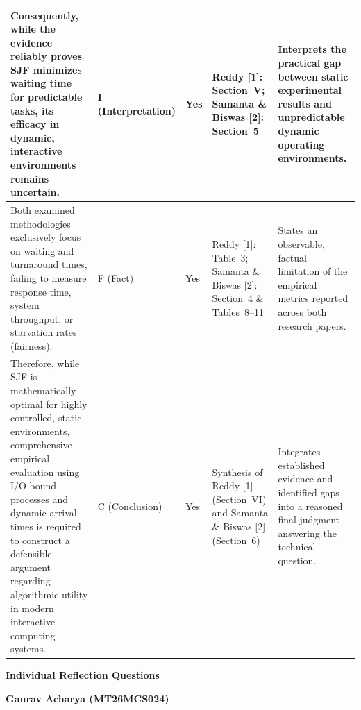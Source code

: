 \documentclass[11pt]{article}
\begin{document}
\begin{longtable}{ |p{3.8cm}|p{1.2cm}|p{1.8cm}|p{3.4cm}|p{4.0cm}| }
    Consequently, while the evidence reliably proves SJF minimizes waiting time for predictable tasks, its efficacy in dynamic, interactive environments remains uncertain. & I (Interpretation) & Yes & Reddy [1]: Section~V; Samanta \& Biswas [2]: Section~5 & Interprets the practical gap between static experimental results and unpredictable dynamic operating environments. \\
    \hline

    Both examined methodologies exclusively focus on waiting and turnaround times, failing to measure response time, system throughput, or starvation rates (fairness). & F (Fact) & Yes & Reddy [1]: Table~3; Samanta \& Biswas [2]: Section~4 \& Tables~8--11 & States an observable, factual limitation of the empirical metrics reported across both research papers. \\
    \hline

    Therefore, while SJF is mathematically optimal for highly controlled, static environments, comprehensive empirical evaluation using I/O-bound processes and dynamic arrival times is required to construct a defensible argument regarding algorithmic utility in modern interactive computing systems. & C (Conclusion) & Yes & Synthesis of Reddy [1] (Section~VI) and Samanta \& Biswas [2] (Section~6) & Integrates established evidence and identified gaps into a reasoned final judgment answering the technical question. \\
    \hline

\end{longtable}


\newpage
{\centering\fontsize{16}{20}\selectfont\textbf{Individual Reflection Questions}\par}
\vspace{1em}

{\centering\fontsize{14}{20}\selectfont\textbf{Gaurav Acharya (MT26MCS024)}}\par
\vspace{1em}
\end{document}
